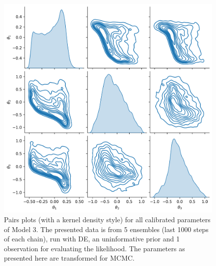\begin{figure}[ht]
\centering
\includegraphics[width=1.0\linewidth]{Figures/appendix_figs/kde_model3_DE.png}
\caption{Pairs plots (with a kernel density style) for all calibrated parameters of Model 3. The presented data is from 5 ensembles (last 1000 steps of each chain), run with DE, an uninformative prior and 1 observation for evaluating the likelihood. The parameters as presented here are transformed for MCMC.}\label{fig_kde_model3_DE}
\end{figure}

